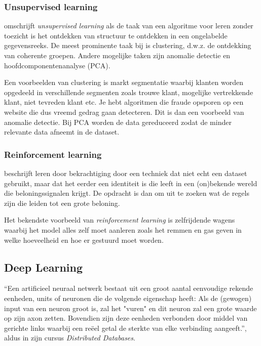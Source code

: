 \subsubsection{Unsupervised learning}
\textcite{Lievens2021} omschrijft \textit{unsupervised learning} als de taak van een algoritme voor leren zonder toezicht is het ontdekken van structuur te ontdekken in een ongelabelde gegevensreeks. De meest prominente taak bij  is clustering, d.w.z. de ontdekking van coherente
groepen. Andere mogelijke taken zijn anomalie detectie en hoofdcomponentenanalyse (PCA).

Een voorbeelden van clustering is markt segmentatie waarbij klanten worden opgedeeld in verschillende segmenten zoals trouwe klant, mogelijke vertrekkende klant, niet tevreden klant etc.
Je hebt algoritmen die fraude opsporen op een website die dus vreemd gedrag gaan detecteren. Dit is dan een voorbeeld van anomalie detectie.
Bij PCA worden de data gereduceerd zodat de minder relevante data afneemt in de dataset.


\subsubsection{Reinforcement learning}
\textcite{Lievens2021} beschrijft leren door bekrachtiging door een techniek dat niet echt een dataset gebruikt, maar dat het eerder een identiteit is die leeft in een (on)bekende wereld die beloningssignalen krijgt. De opdracht is dan om uit te zoeken wat de regels zijn die leiden tot een grote beloning.

Het bekendste voorbeeld van \textit{reinforcement learning} is zelfrijdende wagens waarbij het model alles zelf moet aanleren zoals het remmen en gas geven in welke hoeveelheid en hoe er gestuurd moet worden.

\subsection{Deep Learning}

``Een artificieel neuraal netwerk bestaat uit een groot aantal eenvoudige rekende eenheden, units of neuronen die de volgende eigenschap heeft: Als de (gewogen) input van een neuron groot is, zal het "vuren" en dit neuron zal een grote waarde op zijn axon zetten. Bovendien zijn deze eenheden verbonden door middel van gerichte links waarbij een reëel getal de sterkte van elke verbinding aangeeft.'', aldus  in zijn cursus \textit{Distributed Databases}.

